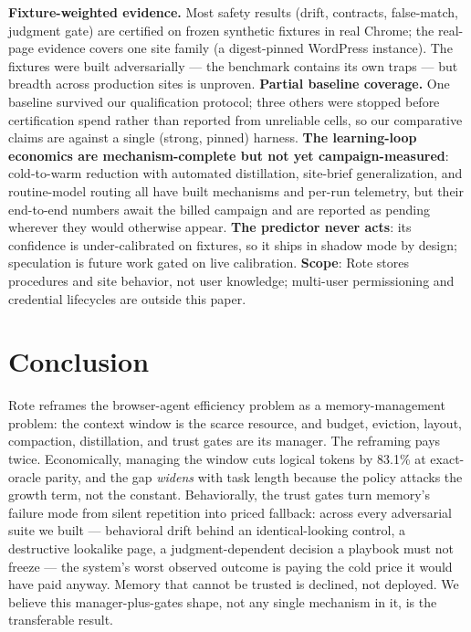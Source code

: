 \documentclass{article} %
\begin{document}
\textbf{Fixture-weighted evidence.} Most safety results (drift, contracts, false-match,
judgment gate) are certified on frozen synthetic fixtures in real Chrome; the real-page
evidence covers one site family (a digest-pinned WordPress instance). The fixtures were
built adversarially --- the benchmark contains its own traps --- but breadth across
production sites is unproven. \textbf{Partial baseline coverage.} One baseline survived
our qualification protocol; three others were stopped before certification spend rather
than reported from unreliable cells, so our comparative claims are against a single
(strong, pinned) harness. \textbf{The learning-loop economics are mechanism-complete
but not yet campaign-measured}: cold-to-warm reduction with automated distillation,
site-brief generalization, and routine-model routing all have built mechanisms and
per-run telemetry, but their end-to-end numbers await the billed campaign and are
reported as pending wherever they would otherwise appear. \textbf{The predictor never acts}: its confidence is under-calibrated on
fixtures, so it ships in shadow mode by design; speculation is future work gated on
live calibration. \textbf{Scope}: Rote stores procedures and site behavior, not user
knowledge; multi-user permissioning and credential lifecycles are outside this paper.

\section{Conclusion}
\label{sec:conclusion}

Rote reframes the browser-agent efficiency problem as a memory-management problem: the
context window is the scarce resource, and budget, eviction, layout, compaction,
distillation, and trust gates are its manager. The reframing pays twice. Economically,
managing the window cuts logical tokens by 83.1\% at exact-oracle parity, and the gap
\emph{widens} with task length because the policy attacks the growth term, not the
constant. Behaviorally, the trust gates turn memory's failure mode from silent
repetition into priced fallback: across every adversarial suite we built --- behavioral
drift behind an identical-looking control, a destructive lookalike page, a
judgment-dependent decision a playbook must not freeze --- the system's worst observed
outcome is paying the cold price it would have paid anyway. Memory that cannot be
trusted is declined, not deployed. We believe this manager-plus-gates shape, not any
single mechanism in it, is the transferable result.
\end{document}

